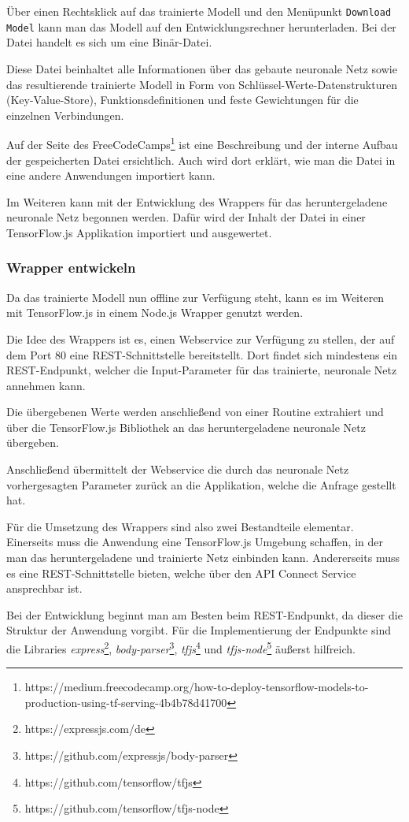 Über einen Rechtsklick auf das trainierte Modell und den Menüpunkt \texttt{Download Model} kann man das Modell auf den
Entwicklungsrechner herunterladen. Bei der Datei handelt es sich um eine Binär-Datei.

Diese Datei beinhaltet alle Informationen über das gebaute neuronale Netz sowie das resultierende trainierte Modell in
Form von Schlüssel-Werte-Datenstrukturen (Key-Value-Store), Funktionsdefinitionen und feste Gewichtungen für die
einzelnen Verbindungen.

Auf der Seite des
FreeCodeCamps\footnote{https://medium.freecodecamp.org/how-to-deploy-tensorflow-models-to-production-using-tf-serving-4b4b78d41700}
ist eine Beschreibung und der interne Aufbau der gespeicherten Datei ersichtlich. Auch wird dort erklärt, wie man die
Datei in eine andere Anwendungen importiert kann.

Im Weiteren kann mit der Entwicklung des Wrappers für das heruntergeladene neuronale Netz begonnen werden. Dafür wird
der Inhalt der Datei in einer TensorFlow.js Applikation importiert und ausgewertet.

\subsubsection{Wrapper entwickeln}
Da das trainierte Modell nun offline zur Verfügung steht, kann es im Weiteren mit TensorFlow.js in einem Node.js Wrapper
genutzt werden.

Die Idee des Wrappers ist es, einen Webservice zur Verfügung zu stellen, der auf dem Port 80 eine REST-Schnittstelle
bereitstellt. Dort findet sich mindestens ein REST-Endpunkt, welcher die Input-Parameter für das trainierte,
neuronale Netz annehmen kann.

Die übergebenen Werte werden anschließend von einer Routine extrahiert und über die TensorFlow.js Bibliothek an das
heruntergeladene neuronale Netz übergeben.

Anschließend übermittelt der Webservice die durch das neuronale Netz vorhergesagten Parameter zurück an die Applikation,
welche die Anfrage gestellt hat.

Für die Umsetzung des Wrappers sind also zwei Bestandteile elementar. Einerseits muss die Anwendung eine TensorFlow.js
Umgebung schaffen, in der man das heruntergeladene und trainierte Netz einbinden kann. Andererseits muss es eine
REST-Schnittstelle bieten, welche über den API Connect Service ansprechbar ist.

Bei der Entwicklung beginnt man am Besten beim REST-Endpunkt, da dieser die Struktur der Anwendung vorgibt. Für die
Implementierung der Endpunkte sind die Libraries \textit{express}\footnote{https://expressjs.com/de},
\textit{body-parser}\footnote{https://github.com/expressjs/body-parser},
\textit{tfjs}\footnote{https://github.com/tensorflow/tfjs} und
\textit{tfjs-node}\footnote{https://github.com/tensorflow/tfjs-node} äußerst hilfreich.

